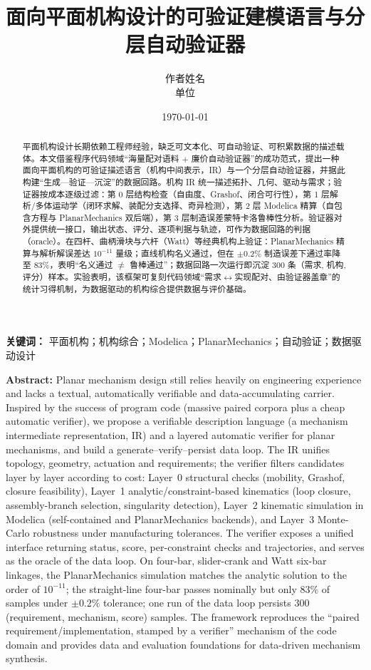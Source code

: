 \documentclass[UTF8,11pt,a4paper]{ctexart}
\title{面向平面机构设计的可验证建模语言与分层自动验证器}
\author{作者姓名\\ \small 单位}
\date{\today}
\begin{document}
\maketitle

\begin{abstract}
平面机构设计长期依赖工程师经验，缺乏可文本化、可自动验证、可积累数据的描述载体。本文借鉴程序代码领域``海量配对语料 $+$ 廉价自动验证器''的成功范式，提出一种面向平面机构的可验证描述语言（机构中间表示，IR）与一个分层自动验证器，并据此构建``生成—验证—沉淀''的数据回路。机构 IR 统一描述拓扑、几何、驱动与需求；验证器按成本逐级过滤：第 0 层结构检查（自由度、Grashof、闭合可行性），第 1 层解析/多体运动学（闭环求解、装配分支选择、奇异检测），第 2 层 Modelica 精算（自包含方程与 PlanarMechanics 双后端），第 3 层制造误差蒙特卡洛鲁棒性分析。验证器对外提供统一接口，输出状态、评分、逐项判据与轨迹，可作为数据回路的判据（oracle）。在四杆、曲柄滑块与六杆（Watt）等经典机构上验证：PlanarMechanics 精算与解析解误差达 $10^{-11}$ 量级；直线机构名义通过，但在 $\pm 0.2\%$ 制造误差下通过率降至 $83\%$，表明``名义通过 $\neq$ 鲁棒通过''；数据回路一次运行即沉淀 300 条（需求, 机构, 评分）样本。实验表明，该框架可复刻代码领域``需求$\leftrightarrow$实现配对、由验证器盖章''的统计习得机制，为数据驱动的机构综合提供数据与评价基础。
\end{abstract}

\noindent\textbf{关键词：} 平面机构；机构综合；Modelica；PlanarMechanics；自动验证；数据驱动设计

\bigskip
\noindent\textbf{Abstract:} Planar mechanism design still relies heavily on engineering experience and lacks a textual, automatically verifiable and data-accumulating carrier. Inspired by the success of program code (massive paired corpora plus a cheap automatic verifier), we propose a verifiable description language (a mechanism intermediate representation, IR) and a layered automatic verifier for planar mechanisms, and build a generate--verify--persist data loop. The IR unifies topology, geometry, actuation and requirements; the verifier filters candidates layer by layer according to cost: Layer~0 structural checks (mobility, Grashof, closure feasibility), Layer~1 analytic/constraint-based kinematics (loop closure, assembly-branch selection, singularity detection), Layer~2 kinematic simulation in Modelica (self-contained and PlanarMechanics backends), and Layer~3 Monte-Carlo robustness under manufacturing tolerances. The verifier exposes a unified interface returning status, score, per-constraint checks and trajectories, and serves as the oracle of the data loop. On four-bar, slider-crank and Watt six-bar linkages, the PlanarMechanics simulation matches the analytic solution to the order of $10^{-11}$; the straight-line four-bar passes nominally but only $83\%$ of samples under $\pm0.2\%$ tolerance; one run of the data loop persists 300 (requirement, mechanism, score) samples. The framework reproduces the ``paired requirement/implementation, stamped by a verifier'' mechanism of the code domain and provides data and evaluation foundations for data-driven mechanism synthesis.
\end{document}
